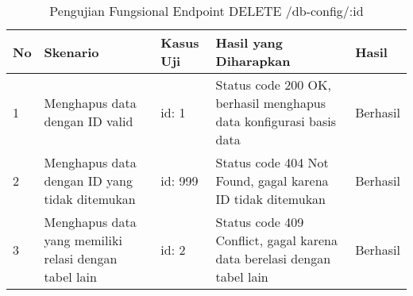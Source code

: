 \begin{table}[H]
    \centering
    \begin{tabular}{|p{0.5cm}|p{3cm}|p{5cm}|p{5cm}|p{1.5cm}|}
        \hline
        \rowcolor[HTML]{DAE8FC} 
        \textbf{No} & \textbf{Skenario} & \textbf{Kasus Uji} & \textbf{Hasil yang Diharapkan} & \textbf{Hasil} \\ \hline
        1 & Menghapus data dengan ID valid & 
        id: 1 & 
        Status code 200 OK, berhasil menghapus data konfigurasi basis data & 
        Berhasil \\ \hline
        2 & Menghapus data dengan ID yang tidak ditemukan & 
        id: 999 & 
        Status code 404 Not Found, gagal karena ID tidak ditemukan & 
        Berhasil \\ \hline
        3 & Menghapus data yang memiliki relasi dengan tabel lain & 
        id: 2 & 
        Status code 409 Conflict, gagal karena data berelasi dengan tabel lain & 
        Berhasil \\ \hline
    \end{tabular}
    \caption{Pengujian Fungsional Endpoint DELETE /db-config/:id}
    \label{tab:db_config_delete_testing}
\end{table}
